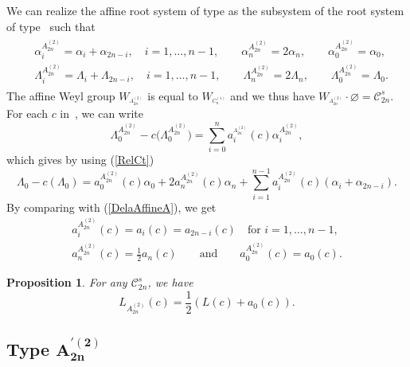\documentclass[10pt,a4paper]{amsart}
\newtheorem{Proposition}[Theorem]{Proposition}
 { \theoremstyle{definition}
\newtheorem{Definition}[Theorem]{Definition}
\newtheorem{Note}[Theorem]{Note}
\newtheorem{Example}[Theorem]{Example}
\newtheorem{Remark}[Theorem]{Remark} }
\numberwithin{equation}{section}
\begin{document}
We can realize the affine root system of type  as the
subsystem of the root system of type~ such that%
\begin{gather*} %
\begin{split}
& \alpha _{i}^{A_{2n}^{(2)}}=\alpha _{i}+\alpha _{2n-i},\quad i=1,\dots ,n-1 ,\qquad
\alpha _{n}^{A_{2n}^{(2)}}=2\alpha _{n} ,\qquad
\alpha _{0}^{A_{2n}^{(2)}}=\alpha _{0},\\
& \Lambda _{i}^{A_{2n}^{(2)}}=\Lambda _{i}+\Lambda _{2n-i},\quad i=1,\dots ,n-1, \qquad
\Lambda _{n}^{A_{2n}^{(2)}}=2\Lambda _{n}, \qquad
\Lambda _{0}^{A_{2n}^{(2)}}=\Lambda _{0}.
\end{split}
\end{gather*}
The affine Weyl group $W_{^{A_{2n}^{(2)}}}$ is equal to $W_{^{C_{n}^{(1)}}}$
and we thus have $W_{^{A_{2n}^{(2)}}}\cdot \varnothing =\mathcal{C}_{2n}^{s}$. For each $c$ in~, we can write
\begin{equation*}
\Lambda _{0}^{A_{2n}^{(2)}}-c\bigl(\Lambda
_{0}^{A_{2n}^{(2)}}\bigr)=\sum_{i=0}^{n}a_{i}^{_{A_{2n}^{(2)}}}(c)\alpha
_{i}^{A_{2n}^{(2)}},
\end{equation*}%
which gives by using (\ref{RelCt})%
\begin{equation*}
\Lambda _{0}-c(\Lambda _{0})=a_{0}^{A_{2n}^{(2)}}(c)\alpha
_{0}+2a_{n}^{A_{2n}^{(2)}}(c)\alpha
_{n}+\sum_{i=1}^{n-1}a_{i}^{A_{2n}^{(2)}}(c)(\alpha _{i}+\alpha _{2n-i})%
 .
\end{equation*}%
By comparing with (\ref{DelaAffineA}), we get%
\begin{gather*}
a_{i}^{A_{2n}^{(2)}}(c)=a_{i}(c)=a_{2n-i}(c)\quad \text{for }i=1,\dots ,n-1, \\
a_{n}^{A_{2n}^{(2)}}(c)=\frac{1}{2}a_{n}(c)\qquad \text{and}\qquad
a_{0}^{A_{2n}^{(2)}}(c)=a_{0}(c).
\end{gather*}

\begin{Proposition}
	\label{Prop_A(2n,2)}For any  $\mathcal{C}
	_{2n}^{s}$, we have
	\begin{equation*}
	L_{A_{2n}^{(2)}}(c)=\frac{1}{2}(L(c)+a_{0}(c)).
	\end{equation*}
\end{Proposition}

\subsection[Type A\_\{2n\}\^{}\{'(2)\}]{Type $\boldsymbol{A_{2n}^{\prime (2)}}$}
\end{document}
